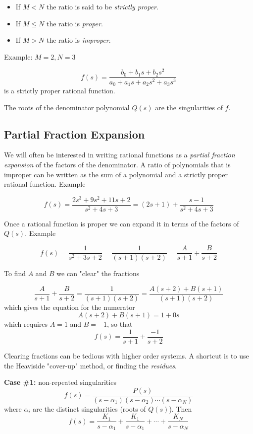 \documentclass{article}
\begin{document}
\begin{itemize}
\item If $M < N$ the ratio is said to be \textit{strictly proper}.
\item If $M \leq N$ the ratio is \textit{proper}.
\item If $M > N$ the ratio is \textit{improper}.
\end{itemize}

Example: $M = 2, N=3$

\[
f(s) = \frac{b_0 + b_1 s + b_2 s^2}{a_0 + a_1 s + a_2 s^2 + a_3 s^3}
\]
is a strictly proper rational function.


The roots of the denominator polynomial $Q(s)$ are the singularities of $f$.

\subsection{Partial Fraction Expansion}

We will often be interested in writing rational functions as a \textit{partial fraction expansion} of the factors of the denominator. A ratio of polynomials that is improper can be written as the sum of a polynomial and a strictly proper rational function. Example

\[
f(s) = \frac{2s^3 + 9s^2 + 11s + 2}{s^2 + 4s + 3} = (2s+1) + \frac{s-1}{s^2 + 4s + 3}
\]

Once a rational function is proper we can expand it in terms of the factors of $Q(s)$. Example

\[
f(s) = \frac{1}{s^2 + 3s +2} = \frac{1}{(s+1)(s+2)} = \frac{A}{s+1} + \frac{B}{s+2}
\]

To find $A$ and $B$ we can "clear" the fractions

\[
\frac{A}{s+1} + \frac{B}{s+2} = \frac{1}{(s+1)(s+2)} = \frac{A(s+2) + B(s+1)}{(s+1)(s+2)}
\]
which gives the equation for the numerator
\[
A(s+2) + B(s+1) = 1 + 0s
\]
which requires $A = 1$ and $B = -1$, so that
\[
f(s) = \frac{1}{s+1} + \frac{-1}{s+2}
\]

Clearing fractions can be tedious with higher order systems. A shortcut is to use the Heaviside "cover-up" method, or finding the \textit{residues}.

\textbf{Case \#1:} non-repeated singularities
\[
f(s) = \frac{P(s)}{(s-\alpha_1)(s-\alpha_2)\cdots (s-\alpha_N)}
\]
where $\alpha_i$ are the distinct singularities (roots of $Q(s)$). Then
\[
f(s) = \frac{K_1}{s-\alpha_1} + \frac{K_1}{s-\alpha_1} + \cdots + \frac{K_N}{s-\alpha_N} 
\]
\end{document}

